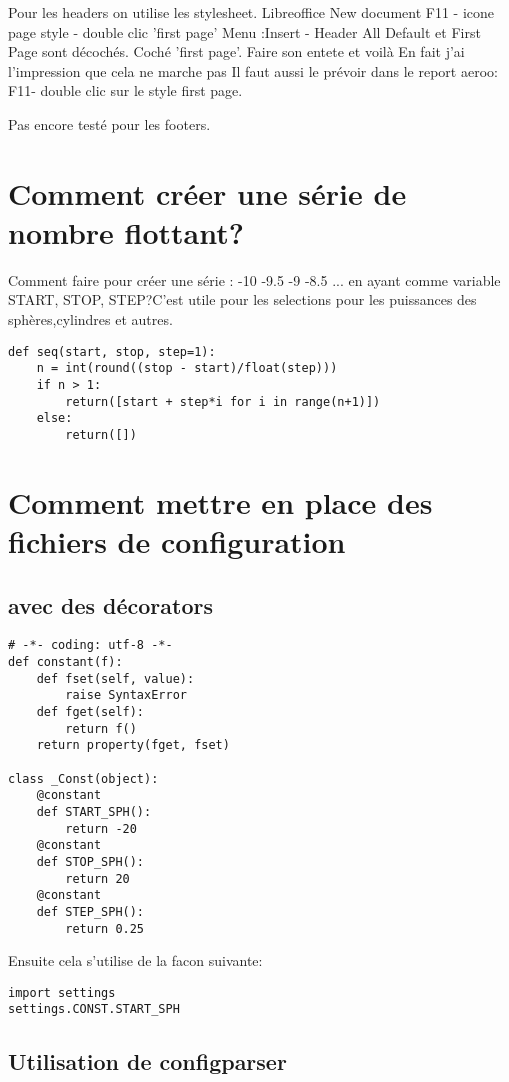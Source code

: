 \documentclass[12pt,a4paper]{article}
\begin{document}
Pour les headers on utilise les stylesheet.
Libreoffice New document F11 - icone page style - double clic 'first page'
Menu :Insert - Header  All Default et First  Page sont décochés. Coché 'first page'.
Faire son entete et voilà
En fait j'ai l'impression que cela ne marche pas
Il faut aussi le prévoir dans le report aeroo: F11- double clic sur le style first page.

Pas encore testé pour les footers.


\section{Comment créer une série de nombre flottant?}
\label{sec:serie}

Comment faire pour créer une série : -10 -9.5 -9 -8.5 ... en ayant comme variable START, STOP, STEP?C'est utile pour les selections pour les puissances des sphères,cylindres et autres.  
\begin{verbatim}
def seq(start, stop, step=1):
    n = int(round((stop - start)/float(step)))
    if n > 1:
        return([start + step*i for i in range(n+1)])
    else:
        return([])
\end{verbatim}

\section{Comment mettre en place des fichiers de configuration}
\label{sec:configfile}

\subsection{avec des décorators}
\label{sec:decorator}
\begin{verbatim}
# -*- coding: utf-8 -*-
def constant(f):
    def fset(self, value):
        raise SyntaxError
    def fget(self):
        return f()
    return property(fget, fset)

class _Const(object):
    @constant
    def START_SPH():
        return -20
    @constant
    def STOP_SPH():
        return 20
    @constant
    def STEP_SPH():
        return 0.25
\end{verbatim}
Ensuite cela s'utilise de la facon suivante:
\begin{verbatim}
import settings
settings.CONST.START_SPH
\end{verbatim}

\subsection{Utilisation de configparser}
\label{sec:configparser}
\end{document}
